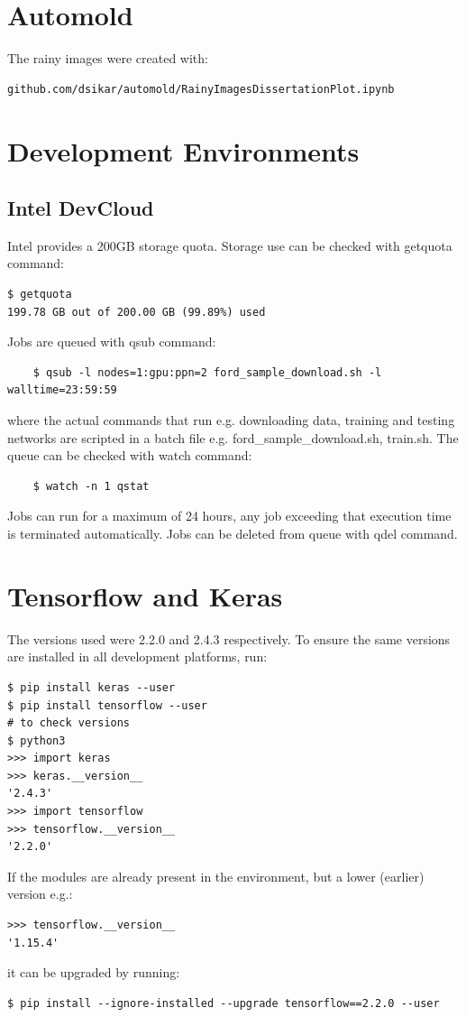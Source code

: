 \section{Automold}
The rainy images were created with:  
\begin{verbatim}
github.com/dsikar/automold/RainyImagesDissertationPlot.ipynb
\end{verbatim}

\section{Development Environments}

\subsection{Intel DevCloud}

Intel provides a 200GB storage quota. Storage use can be checked with getquota command:
\begin{verbatim}
$ getquota
199.78 GB out of 200.00 GB (99.89%) used   
\end{verbatim}
Jobs are queued with qsub command:
\begin{verbatim}
    $ qsub -l nodes=1:gpu:ppn=2 ford_sample_download.sh -l walltime=23:59:59
\end{verbatim}
where the actual commands that run e.g. downloading data, training and testing networks are scripted in a batch file e.g. ford\_sample\_download.sh, train.sh.   
The queue can be checked with watch command:
\begin{verbatim}
    $ watch -n 1 qstat
\end{verbatim}
Jobs can run for a maximum of 24 hours, any job exceeding that execution time is terminated automatically. Jobs can be deleted from queue with qdel command.

\section{Tensorflow and Keras}
\label{methods:tensorflow-keras}
The versions used were 2.2.0 and 2.4.3 respectively. To ensure the same versions are installed in all development platforms, run:
\begin{verbatim}
$ pip install keras --user
$ pip install tensorflow --user
# to check versions
$ python3
>>> import keras
>>> keras.__version__
'2.4.3'
>>> import tensorflow
>>> tensorflow.__version__
'2.2.0'
\end{verbatim}
If the modules are already present in the environment, but a lower (earlier) version e.g.:
\begin{verbatim}
>>> tensorflow.__version__
'1.15.4'    
\end{verbatim}
it can be upgraded by running:
\begin{verbatim}
$ pip install --ignore-installed --upgrade tensorflow==2.2.0 --user
\end{verbatim}

